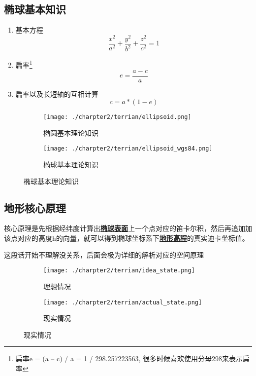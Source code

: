 \subsection{椭球基本知识}
\begin{enumerate}
	\item 基本方程 
	\begin{equation}
		\frac{x^2}{a^2} + \frac{y^2}{b^2} + \frac{z^2}{c^2} = 1
	\end{equation}
	\item 扁率\footnote{扁率e = (a – c) / a = 1 / 298.257223563, 很多时候喜欢使用分母298来表示扁率}
	\begin{equation}
		e = \frac{a - c}{a} 
	\end{equation}
	\item 扁率以及长短轴的互相计算
	\begin{equation}
		c = a * (1 - e)
	\end{equation}
\end{enumerate}	


\begin{figure}[!htb]
	\centering
	\begin{subfigure}[b]{0.4\textwidth}
        \texttt{[image: ./charpter2/terrian/ellipsoid.png]}
        \caption{椭圆基本理论知识}
    \end{subfigure}
    \begin{subfigure}[b]{0.5\textwidth}
		\texttt{[image: ./charpter2/terrian/ellipsoid\_wgs84.png]}	
        \caption{椭球基本理论知识}
    \end{subfigure}
\end{figure}

\subsection{地形核心原理}
核心原理是先根据经纬度计算出\hyperref[sec:ellipsoid-surface]{\textbf{椭球表面}}上一个点对应的笛卡尔积，然后再追加加该点对应的高度h的向量，就可以得到椭球坐标系下\hyperref[sec:ellipsoid-dem-height]{\textbf{地形高程}}的真实迪卡坐标值。
\begin{note}
	这段话开始不理解没关系，后面会极为详细的解析对应的空间原理
\end{note}
\begin{figure}[!htb]
	\centering
	\begin{subfigure}[b]{0.4\textwidth}
        \texttt{[image: ./charpter2/terrian/idea\_state.png]}
        \caption{理想情况}
        \label{fig:idea_state}
    \end{subfigure}
    \begin{subfigure}[b]{0.5\textwidth}
		\texttt{[image: ./charpter2/terrian/actual\_state.png]}	
        \caption{现实情况}
        \label{fig:actual_state}
    \end{subfigure}
\end{figure}

